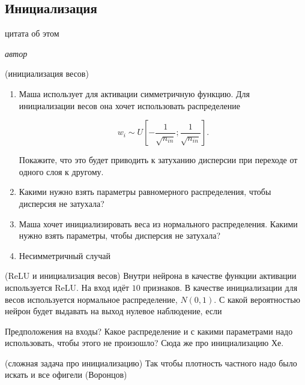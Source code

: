 

\subsection*{Инициализация}

\epigraph{цитата об этом}{\textit{автор}}

\begin{problem}{(инициализация весов)}
    \begin{enumerate}
        \item Маша использует для активации симметричную функцию. Для инициализации весов она хочет использовать распределение 
        
        $$
        w_i \sim U \left[ - \frac{1}{\sqrt{n_{in}}};  \frac{1}{\sqrt{n_{in}}}  \right].
        $$
        
        Покажите, что это будет приводить к затуханию дисперсии при переходе от одного слоя к другому. 
        
        \item Какими нужно взять параметры равномерного распределения, чтобы дисперсия не затухала? 
        
        \item Маша хочет инициализировать веса из нормального распределения. Какими нужно взять параметры, чтобы дисперсия не затухала? 
        
        \item Несимметричный случай
    \end{enumerate}
\end{problem}

\begin{problem}{(ReLU и инициализация весов)}
    Внутри нейрона в качестве функции активации используется ReLU. На вход идёт $10$ признаков. В качестве инициализации для весов используется нормальное распределение, $N(0,1)$. С какой вероятностью нейрон будет выдавать на выход нулевое наблюдение, если 
    
    Предположения на входы? Какое распределение и с какими параметрами надо использовать, чтобы этого не произошло? Сюда же про инициализацию Хе.
\end{problem}


\begin{problem}{(сложная задача про инициализацию)}
Так чтобы плотность частного надо было искать и все офигели (Воронцов)
\end{problem}


